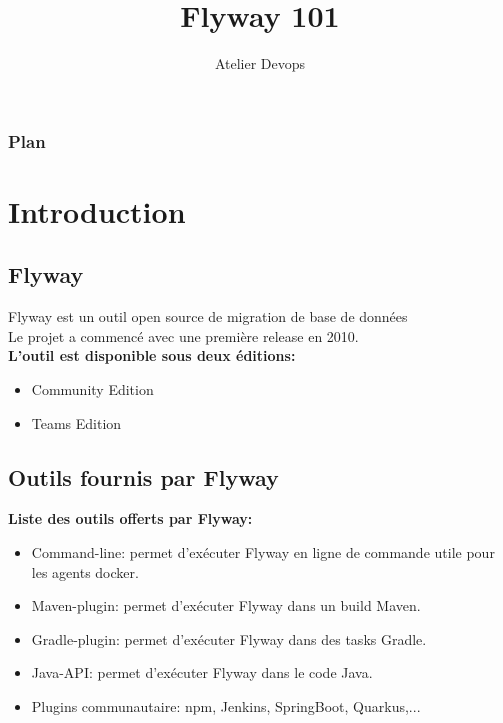 \documentclass[slidestop,compress,11pt,xcolor=dvipsnames,french]{beamer}
\title[Flyway 101]{Flyway 101}
\author[Atelier Devops]{\Large Atelier Devops}
\date[Octobre 2020]{\normalsize
\begin{center}
\parbox{0cm}{\begin{tabbing}
\hspace*{2cm}\= \kill
Auteur :\> Said Mezghanni
\end{tabbing}}
\end{center}
}
\institute{L'équipe du PaaP}
\let\otp\titlepage
\renewcommand{\titlepage}{\otp\addtocounter{framenumber}{-1}}
\begin{document}
\begin{frame}[plain]
\titlepage
\end{frame}
\setcounter{framenumber}{0}
\begin{frame}
  \frametitle{Plan}

  \tableofcontents
\end{frame}
\section{Introduction}
\subsection*{Flyway}
\begin{frame}

Flyway est un outil open source de migration de base de données \\
Le projet a commencé avec une première release en 2010. \\

\vspace{1cm}
\textbf {L'outil est disponible sous deux éditions:  \\}
    \begin{itemize}
        \item Community Edition
        \item Teams Edition 
    \end{itemize}
\end{frame}
\subsection*{Outils fournis par Flyway}
\begin{frame}
\vspace{1cm}
\textbf {Liste des outils offerts par Flyway:\\}
    \begin{itemize}
        \item Command-line: permet d'exécuter Flyway en ligne de commande utile pour les agents docker.
        \item Maven-plugin: permet d'exécuter Flyway dans un build Maven.
        \item Gradle-plugin: permet d'exécuter Flyway dans des tasks Gradle.
        \item Java-API: permet d'exécuter Flyway dans le code Java.
        \item Plugins communautaire: npm, Jenkins, SpringBoot, Quarkus,...
    \end{itemize}
\end{frame} 
\end{document}
